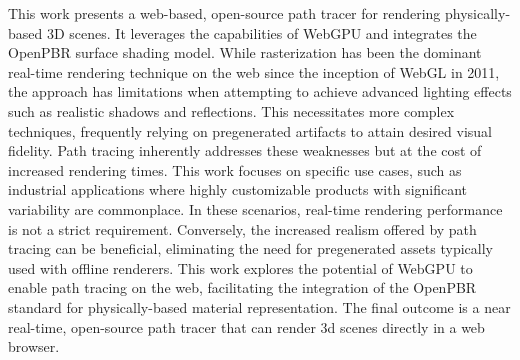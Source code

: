 
This work presents a web-based, open-source path tracer for rendering physically-based 3D scenes. It leverages the capabilities of WebGPU and integrates the OpenPBR surface shading model. While rasterization has been the dominant real-time rendering technique on the web since the inception of WebGL in 2011, the approach has limitations when attempting to achieve advanced lighting effects such as realistic shadows and reflections. This necessitates more complex techniques, frequently relying on pregenerated artifacts to attain desired visual fidelity. Path tracing inherently addresses these weaknesses but at the cost of increased rendering times. This work focuses on specific use cases, such as industrial applications where highly customizable products with significant variability are commonplace. In these scenarios, real-time rendering performance is not a strict requirement. Conversely, the increased realism offered by path tracing can be beneficial, eliminating the need for pregenerated assets typically used with offline renderers. This work explores the potential of WebGPU to enable path tracing on the web, facilitating the integration of the OpenPBR standard for physically-based material representation. The final outcome is a near real-time, open-source path tracer that can render 3d scenes directly in a web browser.
